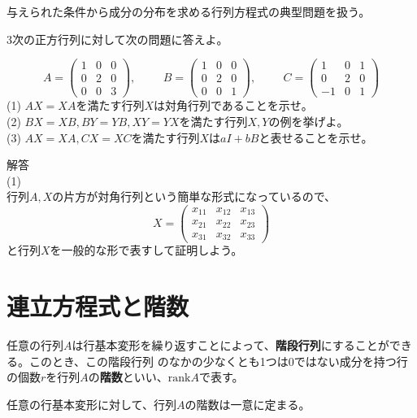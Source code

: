 \documentclass{jlreq}
\begin{document}
与えられた条件から成分の分布を求める行列方程式の典型問題を扱う。

\begin{problem}
  3次の正方行列に対して次の問題に答えよ。

  \begin{equation*}
    A = \begin{pmatrix}
      1 & 0 & 0 \\
      0 & 2 & 0 \\
      0 & 0 & 3
    \end{pmatrix}, \hspace{1cm}
    B = \begin{pmatrix}
      1 & 0 & 0 \\
      0 & 2 & 0 \\
      0 & 0 & 1
    \end{pmatrix}, \hspace{1cm}
    C = \begin{pmatrix}
      1 & 0 & 1 \\
      0 & 2 & 0 \\
      -1 & 0 & 1
    \end{pmatrix}
  \end{equation*}
  (1) $AX = XA$を満たす行列$X$は対角行列であることを示せ。 \\
  (2) $BX = XB, BY = YB, XY = YX$を満たす行列$X, Y$の例を挙げよ。 \\
  (3) $AX = XA, CX = XC$を満たす行列$X$は$a I + b B$と表せることを示せ。 

  \dotfill

  解答 \\
  (1) \\
  行列$A, X$の片方が対角行列という簡単な形式になっているので、
  \begin{equation*}
    X = \begin{pmatrix}
      x_{11} & x_{12} & x_{13} \\
      x_{21} & x_{22} & x_{23} \\
      x_{31} & x_{32} & x_{33}
    \end{pmatrix}
  \end{equation*}
  と行列$X$を一般的な形で表すして証明しよう。
\end{problem}

\section{連立方程式と階数}
\begin{definitionbox}[階数]
  任意の行列$A$は行基本変形を繰り返すことによって、\textbf{階段行列}にすることができる。このとき、この階段行列
  のなかの少なくとも1つは0ではない成分を持つ行の個数$r$を行列$A$の\textbf{階数}といい、$\text{rank} A$で表す。

  任意の行基本変形に対して、行列$A$の階数は一意に定まる。
\end{definitionbox}
\end{document}
